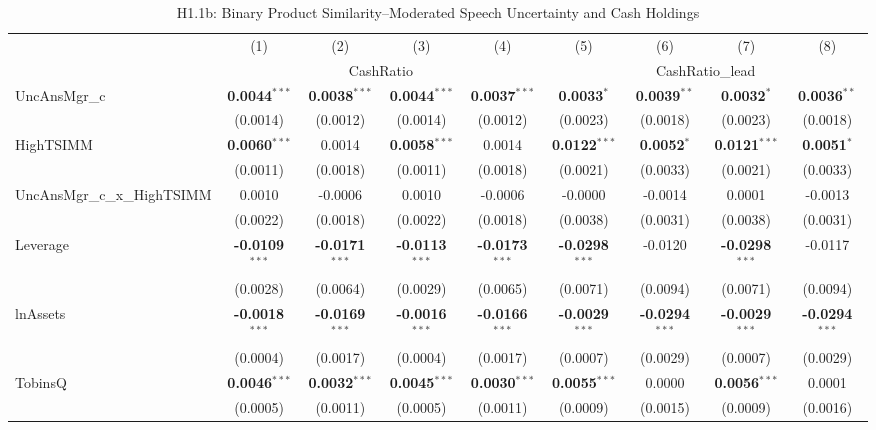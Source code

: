 \documentclass[11pt,a4paper]{article}
\begin{document}
\begin{table}[htbp]
\centering
\caption{H1.1b: Binary Product Similarity--Moderated Speech Uncertainty and Cash Holdings}
\label{tab:h1_1b}
\scriptsize
\begin{tabular}{lcccccccc}
\toprule
 & (1) & (2) & (3) & (4) & (5) & (6) & (7) & (8) \\
 & \multicolumn{4}{c}{CashRatio} & \multicolumn{4}{c}{CashRatio\_lead} \\
\cmidrule(lr){2-5} \cmidrule(lr){6-9}
\midrule
UncAnsMgr\_c & \textbf{0.0044}$^{***}$ & \textbf{0.0038}$^{***}$ & \textbf{0.0044}$^{***}$ & \textbf{0.0037}$^{***}$ & \textbf{0.0033}$^{*}$ & \textbf{0.0039}$^{**}$ & \textbf{0.0032}$^{*}$ & \textbf{0.0036}$^{**}$ \\
 & (0.0014) & (0.0012) & (0.0014) & (0.0012) & (0.0023) & (0.0018) & (0.0023) & (0.0018) \\
HighTSIMM & \textbf{0.0060}$^{***}$ & 0.0014 & \textbf{0.0058}$^{***}$ & 0.0014 & \textbf{0.0122}$^{***}$ & \textbf{0.0052}$^{*}$ & \textbf{0.0121}$^{***}$ & \textbf{0.0051}$^{*}$ \\
 & (0.0011) & (0.0018) & (0.0011) & (0.0018) & (0.0021) & (0.0033) & (0.0021) & (0.0033) \\
UncAnsMgr\_c\_x\_HighTSIMM & 0.0010 & -0.0006 & 0.0010 & -0.0006 & -0.0000 & -0.0014 & 0.0001 & -0.0013 \\
 & (0.0022) & (0.0018) & (0.0022) & (0.0018) & (0.0038) & (0.0031) & (0.0038) & (0.0031) \\
\midrule
Leverage & \textbf{-0.0109}$^{***}$ & \textbf{-0.0171}$^{***}$ & \textbf{-0.0113}$^{***}$ & \textbf{-0.0173}$^{***}$ & \textbf{-0.0298}$^{***}$ & -0.0120 & \textbf{-0.0298}$^{***}$ & -0.0117 \\
 & (0.0028) & (0.0064) & (0.0029) & (0.0065) & (0.0071) & (0.0094) & (0.0071) & (0.0094) \\
lnAssets & \textbf{-0.0018}$^{***}$ & \textbf{-0.0169}$^{***}$ & \textbf{-0.0016}$^{***}$ & \textbf{-0.0166}$^{***}$ & \textbf{-0.0029}$^{***}$ & \textbf{-0.0294}$^{***}$ & \textbf{-0.0029}$^{***}$ & \textbf{-0.0294}$^{***}$ \\
 & (0.0004) & (0.0017) & (0.0004) & (0.0017) & (0.0007) & (0.0029) & (0.0007) & (0.0029) \\
TobinsQ & \textbf{0.0046}$^{***}$ & \textbf{0.0032}$^{***}$ & \textbf{0.0045}$^{***}$ & \textbf{0.0030}$^{***}$ & \textbf{0.0055}$^{***}$ & 0.0000 & \textbf{0.0056}$^{***}$ & 0.0001 \\
 & (0.0005) & (0.0011) & (0.0005) & (0.0011) & (0.0009) & (0.0015) & (0.0009) & (0.0016) \\

\end{tabular}
\end{table}
\end{document}
